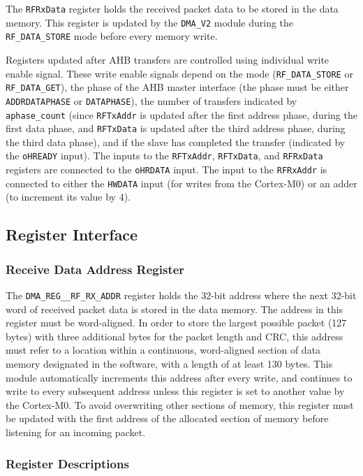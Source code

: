 The \texttt{RFRxData} register holds the received packet data to be stored in the data memory. This register is updated by the \texttt{DMA\_V2} module during the \texttt{RF\_DATA\_STORE} mode before every memory write.

Registers updated after AHB transfers are controlled using individual write enable signal. These write enable signals depend on the mode (\texttt{RF\_DATA\_STORE} or \texttt{RF\_DATA\_GET}), the phase of the AHB master interface (the phase must be either \texttt{ADDRDATAPHASE} or \texttt{DATAPHASE}), the number of transfers indicated by \texttt{aphase\_count} (since \texttt{RFTxAddr} is updated after the first address phase, during the first data phase, and \texttt{RFTxData} is updated after the third address phase, during the third data phase), and if the slave has completed the transfer (indicated by the \texttt{oHREADY} input). The inputs to the \texttt{RFTxAddr}, \texttt{RFTxData}, and \texttt{RFRxData} registers are connected to the \texttt{oHRDATA} input. The input to the \texttt{RFRxAddr} is connected to either the \texttt{HWDATA} input (for writes from the Cortex-M0) or an adder (to increment its value by 4).

\subsection{Register Interface} \label{dma-registers}
\subsubsection{Receive Data Address Register}
The \texttt{DMA\_REG\_\_RF\_RX\_ADDR} register holds the 32-bit address where the next 32-bit word of received packet data is stored in the data memory. The address in this register must be word-aligned. In order to store the largest possible packet (127 bytes) with three additional bytes for the packet length and CRC, this address must refer to a location within a continuous, word-aligned section of data memory designated in the software, with a length of at least 130 bytes. This module automatically increments this address after every write, and continues to write to every subsequent address unless this register is set to another value by the Cortex-M0. To avoid overwriting other sections of memory, this register must be updated with the first address of the allocated section of memory before listening for an incoming packet.

\subsubsection{Register Descriptions}

